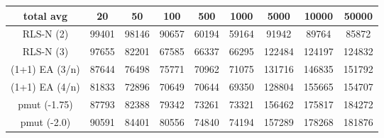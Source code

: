 \begin{tabular}[h]{ccccccccc}
total avg&20&50&100&500&1000&5000&10000&50000\\\hline
RLS-N (2)&99401&98146&90657&60194&59164&91942&89764&85872\\
RLS-N (3)&97655&82201&67585&66337&66295&122484&124197&124832\\
(1+1) EA (3/n)&87644&76498&75771&70962&71075&131716&146835&151792\\
(1+1) EA (4/n)&81833&72896&70649&70644&69350&128804&155665&154707\\
pmut (-1.75)&87793&82388&79342&73261&73321&156462&175817&184272\\
pmut (-2.0)&90591&84401&80556&74840&74194&157289&178268&181876\\
\end{tabular}

